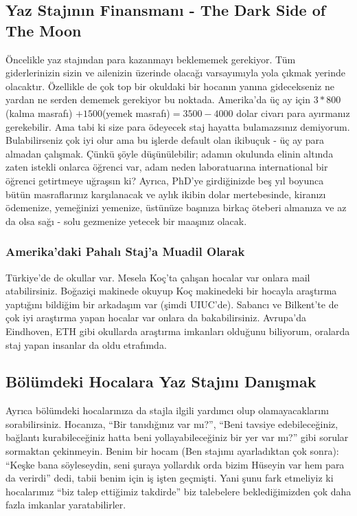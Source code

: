 \documentclass[12pt]{article}
\begin{document}
\subsection{Yaz Stajının Finansmanı - The Dark Side of The Moon}
Öncelikle yaz stajından para kazanmayı beklememek gerekiyor. Tüm giderlerinizin sizin ve ailenizin üzerinde olacağı varsayımıyla yola çıkmak yerinde olacaktır. Özellikle de çok top bir okuldaki bir hocanın yanına gidecekseniz ne yardan ne serden dememek gerekiyor bu noktada. Amerika’da üç ay için $3 * 800$ (kalma masrafı) $+ 1500 $(yemek masrafı)$=3500-4000$ dolar civarı para ayırmanız gerekebilir. Ama tabi ki size para ödeyecek staj hayatta bulamazsınız demiyorum. Bulabilirseniz çok iyi olur ama bu işlerde default olan ikibuçuk - üç ay para almadan çalışmak. Çünkü şöyle düşünülebilir; adamın okulunda elinin altında zaten istekli onlarca öğrenci var, adam neden laboratuarına international bir öğrenci getirtmeye uğraşsın ki? Ayrıca, PhD’ye girdiğinizde beş yıl boyunca bütün masraflarınız karşılanacak ve aylık ikibin dolar mertebesinde, kiranızı ödemenize, yemeğinizi yemenize, üstünüze başınıza birkaç öteberi almanıza ve az da olsa sağı - solu gezmenize yetecek bir maaşınız olacak.

\subsubsection{Amerika’daki Pahalı Staj’a Muadil Olarak}
Türkiye’de de okullar var. Mesela Koç’ta çalışan hocalar var onlara mail atabilirsiniz. Boğaziçi makinede okuyup Koç makinedeki bir hocayla araştırma yaptığını bildiğim bir arkadaşım var (şimdi UIUC’de). Sabancı ve Bilkent’te de çok iyi araştırma yapan hocalar var onlara da bakabilirsiniz. Avrupa’da Eindhoven, ETH gibi okullarda araştırma imkanları olduğunu biliyorum, oralarda staj yapan insanlar da oldu etrafımda.

\subsection{Bölümdeki Hocalara Yaz Stajını Danışmak}
Ayrıca bölümdeki hocalarınıza da stajla ilgili yardımcı olup olamayacaklarını sorabilirsiniz. Hocanıza, “Bir tanıdığınız var mı?”, “Beni tavsiye edebileceğiniz, bağlantı kurabileceğiniz hatta beni yollayabileceğiniz bir yer var mı?” gibi sorular sormaktan çekinmeyin. Benim bir hocam (Ben stajımı ayarladıktan çok sonra): ``Keşke bana söyleseydin, seni şuraya yollardık orda bizim Hüseyin var hem para da verirdi'' dedi, tabii benim için iş işten geçmişti. Yani şunu fark etmeliyiz ki hocalarımız “biz talep ettiğimiz takdirde” biz talebelere beklediğimizden çok daha fazla imkanlar yaratabilirler.
\end{document}
